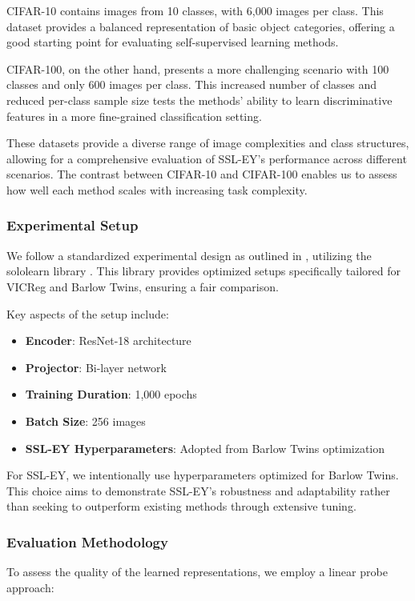 CIFAR-10 contains images from 10 classes, with 6,000 images per class. This dataset provides a balanced representation of basic object categories, offering a good starting point for evaluating self-supervised learning methods.

CIFAR-100, on the other hand, presents a more challenging scenario with 100 classes and only 600 images per class. This increased number of classes and reduced per-class sample size tests the methods' ability to learn discriminative features in a more fine-grained classification setting.

These datasets provide a diverse range of image complexities and class structures, allowing for a comprehensive evaluation of SSL-EY's performance across different scenarios. The contrast between CIFAR-10 and CIFAR-100 enables us to assess how well each method scales with increasing task complexity.

\subsubsection{Experimental Setup}
We follow a standardized experimental design as outlined in \citet{tong2023emp}, utilizing the sololearn library \citep{da2022solo}. This library provides optimized setups specifically tailored for VICReg and Barlow Twins, ensuring a fair comparison.

Key aspects of the setup include:
\begin{itemize}
    \item \textbf{Encoder}: ResNet-18 architecture
    \item \textbf{Projector}: Bi-layer network
    \item \textbf{Training Duration}: 1,000 epochs
    \item \textbf{Batch Size}: 256 images
    \item \textbf{SSL-EY Hyperparameters}: Adopted from Barlow Twins optimization
\end{itemize}

For SSL-EY, we intentionally use hyperparameters optimized for Barlow Twins. This choice aims to demonstrate SSL-EY's robustness and adaptability rather than seeking to outperform existing methods through extensive tuning.

\subsubsection{Evaluation Methodology}
To assess the quality of the learned representations, we employ a linear probe approach:

